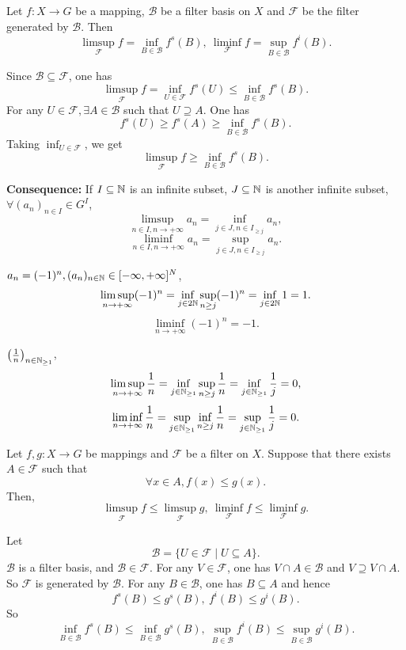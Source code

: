 \begin{propositionenv}
    Let $f:X\longrightarrow G$ be a mapping, $\mathcal{B}$ be a filter basis on $X$ and $\mathcal{F}$ be the filter generated by $\mathcal{B}$. Then
    $$\limsup _{\mathcal{F}}f=\inf_{B\in \mathcal{B}}f^s(B),\ \liminf _{\mathcal{F}}f=\sup_{B\in \mathcal{B}}f^i(B).$$
\end{propositionenv}
\begin{proofenv}
    Since $\mathcal{B}\subseteq \mathcal{F}$, one has 
    $$\limsup_{\mathcal{F}}f=\inf_{U\in \mathcal{F}}f^s(U)\le \inf_{B\in \mathcal{B}}f^s(B).$$
    For any $U\in \mathcal{F},\exists A\in \mathcal{B}$ such that $U\supseteq A$. One has
    $$f^s(U)\ge f^s(A)\ge \inf_{B\in \mathcal{B}}f^s(B).$$
    Taking $\inf_{U\in \mathcal{F}}$, we get
    $$\limsup_{\mathcal{F}}f\ge \inf_{B\in \mathcal{B}}f^s(B).$$
\end{proofenv}
\begin{box2}
\textbf{Consequence:} \quad If $I\subseteq\mathbb{N}$ is an infinite subset, $J\subseteq \mathbb{N}$ is another infinite subset, $\forall (a_n)_{n\in I}\in G^I$,
$$\limsup_{n\in I,n\rightarrow+\infty}a_n=\inf_{j\in J,n\in I_{\ge j}}a_n,$$
$$\liminf_{n\in I,n\rightarrow+\infty}a_n=\sup_{j\in J,n\in I_{\ge j}}a_n.$$
\end{box2}
\begin{exampleenv}
     $a_n=(-1)^n, (a_n)_{n\in \mathbb{N}}\in [-\infty,+\infty]^N$,
     $$\limsup_{n\rightarrow +\infty}(-1)^n=\inf_{j\in 2\mathbb{N}}\sup_{n\ge j}(-1)^n=\inf_{j\in 2\mathbb{N}}1=1.$$
     $$\liminf_{n\rightarrow+\infty}(-1)^n=-1.$$
\end{exampleenv}
\begin{exampleenv}
    $\left(\frac{1}{n}\right)_{n\in \mathbb{N}_{\ge 1}}$,
    $$\limsup_{n\rightarrow+\infty}\frac{1}{n}=\inf_{j\in \mathbb{N}_{\ge 1}}\sup_{n\ge j}\frac{1}{n}=\inf_{j\in \mathbb{N}_{\ge 1}}\frac{1}{j}=0,$$
    $$\liminf_{n\rightarrow+\infty}\frac{1}{n}=\sup_{j\in \mathbb{N}_{\ge 1}}\inf_{n\ge j}\frac{1}{n}=\sup_{j\in \mathbb{N}_{\ge 1}}\frac{1}{j}=0.$$
\end{exampleenv}
\begin{propositionenv}
    Let $f,g:X\longrightarrow G$ be mappings and $\mathcal{F}$ be a filter on $X$. Suppose that there exists $A\in \mathcal{F}$ such that 
    $$\forall x\in A, f(x)\le g(x).$$
    Then,
    $$\limsup_{\mathcal{F}}f\le \limsup_{\mathcal{F}}g,\ \liminf_{\mathcal{F}}f\le \liminf_{\mathcal{F}}g.$$ 
\end{propositionenv}
\begin{proofenv}
    Let 
    $$\mathcal{B}=\{U\in \mathcal{F}\mid  U\subseteq A\}.$$
    $\mathcal{B}$ is a filter basis, and $\mathcal{B}\in \mathcal{F}$. For any $V\in \mathcal{ F}$, one has $V\cap A\in \mathcal{B}$ and $V\supseteq V\cap A$. So $\mathcal{F}$ is generated by $\mathcal{ B}$. For any $B\in \mathcal{B}$, one has $B\subseteq A$ and hence
    $$f^s(B)\le g^s(B),\ f^i(B)\le g^i(B).$$
    So 
    $$\inf_{B\in \mathcal{B}}f^s(B)\le \inf_{B\in \mathcal{B}}g^s(B),\ \sup_{B\in \mathcal{B}}f^i(B)\le \sup_{B\in \mathcal{B}}g^i(B).$$
\end{proofenv}
